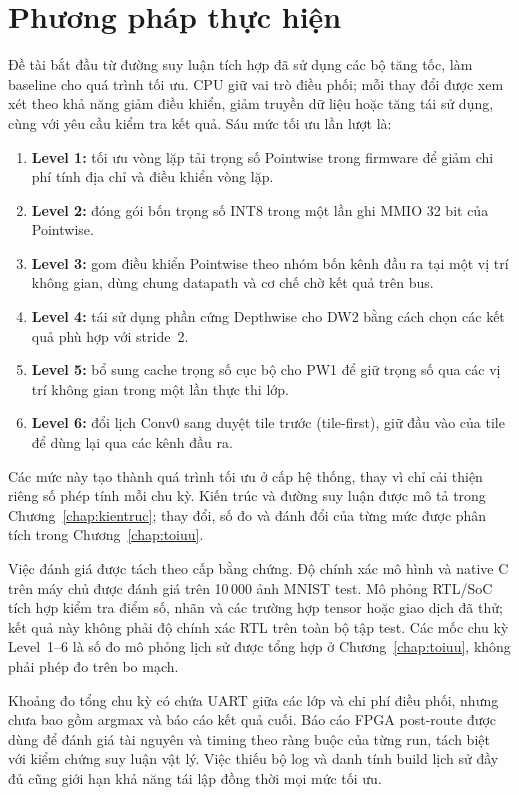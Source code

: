 \section{Phương pháp thực hiện}
Đề tài bắt đầu từ đường suy luận tích hợp đã sử dụng các bộ tăng tốc, làm baseline cho quá trình tối ưu. CPU giữ vai trò điều phối; mỗi thay đổi được xem xét theo khả năng giảm điều khiển, giảm truyền dữ liệu hoặc tăng tái sử dụng, cùng với yêu cầu kiểm tra kết quả. Sáu mức tối ưu lần lượt là:
\begin{enumerate}
    \item \textbf{Level 1:} tối ưu vòng lặp tải trọng số Pointwise trong firmware để giảm chi phí tính địa chỉ và điều khiển vòng lặp.
    \item \textbf{Level 2:} đóng gói bốn trọng số INT8 trong một lần ghi MMIO 32 bit của Pointwise.
    \item \textbf{Level 3:} gom điều khiển Pointwise theo nhóm bốn kênh đầu ra tại một vị trí không gian, dùng chung datapath và cơ chế chờ kết quả trên bus.
    \item \textbf{Level 4:} tái sử dụng phần cứng Depthwise cho DW2 bằng cách chọn các kết quả phù hợp với stride~2.
    \item \textbf{Level 5:} bổ sung cache trọng số cục bộ cho PW1 để giữ trọng số qua các vị trí không gian trong một lần thực thi lớp.
    \item \textbf{Level 6:} đổi lịch Conv0 sang duyệt tile trước (tile-first), giữ đầu vào của tile để dùng lại qua các kênh đầu ra.
\end{enumerate}
Các mức này tạo thành quá trình tối ưu ở cấp hệ thống, thay vì chỉ cải thiện riêng số phép tính mỗi chu kỳ. Kiến trúc và đường suy luận được mô tả trong Chương~\ref{chap:kientruc}; thay đổi, số đo và đánh đổi của từng mức được phân tích trong Chương~\ref{chap:toiuu}.

Việc đánh giá được tách theo cấp bằng chứng. Độ chính xác mô hình và native C trên máy chủ được đánh giá trên 10\,000 ảnh MNIST test. Mô phỏng RTL/SoC tích hợp kiểm tra điểm số, nhãn và các trường hợp tensor hoặc giao dịch đã thử; kết quả này không phải độ chính xác RTL trên toàn bộ tập test. Các mốc chu kỳ Level~1--6 là số đo mô phỏng lịch sử được tổng hợp ở Chương~\ref{chap:toiuu}, không phải phép đo trên bo mạch.

Khoảng đo tổng chu kỳ có chứa UART giữa các lớp và chi phí điều phối, nhưng chưa bao gồm argmax và báo cáo kết quả cuối. Báo cáo FPGA post-route được dùng để đánh giá tài nguyên và timing theo ràng buộc của từng run, tách biệt với kiểm chứng suy luận vật lý. Việc thiếu bộ log và danh tính build lịch sử đầy đủ cũng giới hạn khả năng tái lập đồng thời mọi mức tối ưu.

